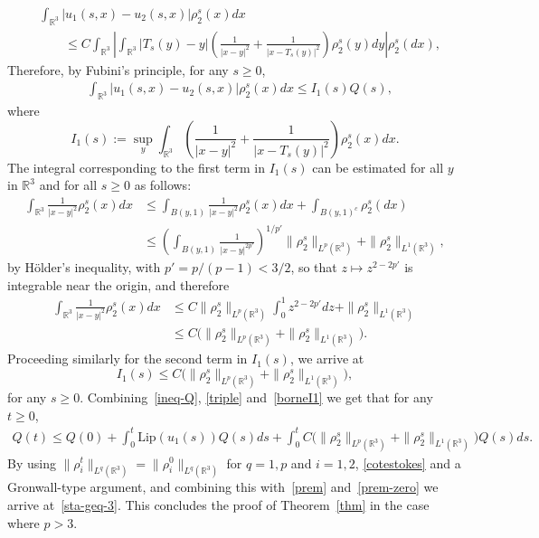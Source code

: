 \documentclass[AHL,Unicode,longabstracts,published]{cedram}
\newcommand{\Lip}{\mathrm{Lip}}
\newcommand{\R}{\mathbb{R}}
\renewcommand{\leq}{\leqslant}
\renewcommand{\geq}{\geqslant}
\begin{document}
\begin{align*}
&\int_{\R^3} |u_1(s,x)-u_2(s,x)| \rho^s_2(x)dx
\\ &\quad \quad \leq C \int_{\R^3} \left| \int_{\R^3}|T_s (y)-y| \left(\frac{1}{|x-y|^2}+ \frac{1}{|x-T_s (y)|^2} \right) \rho_2^s(y)dy \right| \rho_2^s(dx),
\end{align*}
Therefore, by Fubini's principle, for any $s\geq 0$,
\begin{align}\label{triple}
& \int_{\R^3} |u_1(s,x)-u_2(s,x)| \rho_2^s(x)dx \leq I_1 (s) Q(s),
\end{align}
where
\begin{equation*}
I_1 (s):= \sup_y \int_{\R^3} \left(\frac{1}{|x-y|^2}+ \frac{1}{|x-T_s (y)|^2} \right) \rho_2^s (x)dx.
\end{equation*}
The integral corresponding to the first term in $I_1 (s)$ can be estimated for all $y$ in $\R^3$ and for all $s\geq 0$ as follows:
\begin{align*}
\int_{\R^3} \frac{1}{|x-y|^2}\rho_2^s(x)dx &\leq \int_{B(y,1)}\frac{1}{|x-y|^2} \rho_2^s(x) dx + \int_{B(y,1)^c} \rho_2^s(dx) \\
& \leq \left(\int_{B(y,1)} \frac{1}{|x-y|^{2p'}}\right)^{1/p'} \| \rho_2^s\|_{L^p\left(\R^3\right)} + \|\rho_2^s\|_{L^1\left(\R^3\right)},
\end{align*}
by H\"older's inequality, with $p'= p/(p-1)<3/2$, so that $z\mapsto z^{2-2p'}$ is integrable near the origin, and therefore
\begin{align*}
\int_{\R^3} \frac{1}{|x-y|^2}\rho_2^s(x)dx
&\leq C\| \rho_2^s\|_{L^p\left(\R^3\right)} \int_0^1 z^{2-2p'} dz + \|\rho_2^s\|_{L^1\left(\R^3\right)} \\ &\leq C\big(\| \rho_2^s\|_{L^p\left(\R^3\right)}+ \|\rho_2^s\|_{L^1\left(\R^3\right)}\big).
\end{align*}
Proceeding similarly for the second term in $I_1 (s)$, we arrive at
\begin{equation}\label{borneI1}
I_1 (s) \leq C \big(\| \rho_2^s\|_{L^p\left(\R^3\right)}+ \|\rho_2^s\|_{L^1\left(\R^3\right)}\big),
\end{equation}
for any $s\geq 0$. Combining~\eqref{ineq-Q}, \eqref{triple} and~\eqref{borneI1} we get that for any $t\geq 0$,
\begin{align*}
Q(t) \leq Q(0) + \int_0^t \Lip(u_1(s)) Q(s) ds+ \int_0^t C \big(\| \rho_2^s\|_{L^p\left(\R^3\right)}+ \|\rho_2^s\|_{L^1\left(\R^3\right)}\big)Q(s) ds.
\end{align*}
By using $\|\rho_i^t\|_{L^q(\R^3)}=\|\rho_i^0\|_{L^q(\R^3)}$ for $q=1,p$ and $i=1,2$, \eqref{cotestokes} and a Gronwall-type argument, and combining this with~\eqref{prem} and~\eqref{prem-zero} we arrive at~\eqref{sta-geq-3}. This concludes the proof of Theorem~\ref{thm} in the case where $p> 3$.
\end{document}
